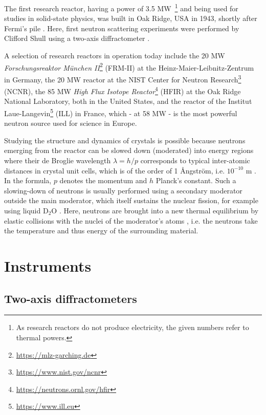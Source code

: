 The first research reactor, having a power of 3.5 MW~\footnote{As research reactors do not produce electricity, the given numbers refer to thermal powers.} and being used for studies in solid-state physics, was built in Oak Ridge, USA in 1943, shortly after Fermi's pile \cite[p. 3]{Jacrot2021}. 
Here, first neutron scattering experiments were performed by Clifford Shull using a two-axis diffractometer \cite[pp. 3, 37]{Jacrot2021}.

A selection of research reactors in operation today include the 20 MW \textit{Forschungsreaktor M\"unchen II}\footnote{\url{https://mlz-garching.de}} (FRM-II) at the Heinz-Maier-Leibnitz-Zentrum in Germany, the 20 MW reactor at the NIST Center for Neutron Research\footnote{\url{https://www.nist.gov/ncnr}} (NCNR), the 85 MW \textit{High Flux Isotope Reactor}\footnote{\url{https://neutrons.ornl.gov/hfir}} (HFIR) at the Oak Ridge National Laboratory, both in the United States, and the reactor of the Institut Laue-Langevin\footnote{\url{https://www.ill.eu}} (ILL) in France, which - at 58 MW - is the most powerful neutron source used for science in Europe.

Studying the structure and dynamics of crystals is possible because neutrons emerging from the reactor can be slowed down (moderated) into energy regions where their de Broglie wavelength $\lambda = h/p$ corresponds to typical inter-atomic distances in crystal unit cells, which is of the order of 1 \AA{}ngstr\"om, i.e. $10^{-10}$ m \cite[pp.1,3]{Squires2012}. In the formula, $p$ denotes the momentum and $h$ Planck's constant. Such a slowing-down of neutrons is usually performed using a secondary moderator outside the main moderator, which itself sustains the nuclear fission, for example using liquid $\mathrm{D_2O}$ \cite[p. 82]{Jacrot2021}. Here, neutrons are brought into a new thermal equilibrium by elastic collisions with the nuclei of the moderator's atoms \cite[p. 30]{Stacey2007}, i.e. the neutrons take the temperature and thus energy of the surrounding material.



\section{Instruments \label{sec:instruments}}
\subsection{Two-axis diffractometers}

